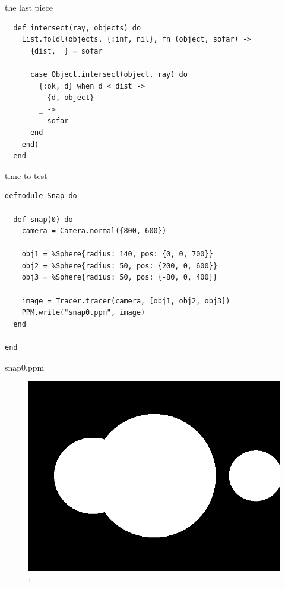 \begin{frame}[fragile]{the last piece}

\begin{verbatim}
  def intersect(ray, objects) do
    List.foldl(objects, {:inf, nil}, fn (object, sofar) ->
      {dist, _} = sofar

      case Object.intersect(object, ray) do
        {:ok, d} when d < dist ->
          {d, object}
        _ ->
          sofar
      end
    end)
  end
\end{verbatim}

\end{frame}

\begin{frame}[fragile]{time to test}
\begin{verbatim}
defmodule Snap do

  def snap(0) do
    camera = Camera.normal({800, 600})

    obj1 = %Sphere{radius: 140, pos: {0, 0, 700}}
    obj2 = %Sphere{radius: 50, pos: {200, 0, 600}}
    obj3 = %Sphere{radius: 50, pos: {-80, 0, 400}}

    image = Tracer.tracer(camera, [obj1, obj2, obj3])
    PPM.write("snap0.ppm", image)
  end

end
\end{verbatim}
\end{frame}

\begin{frame}{snap0.ppm}

\begin{figure}
\includegraphics[scale=0.3]{snap0.png};
\end{figure}

\end{frame}


